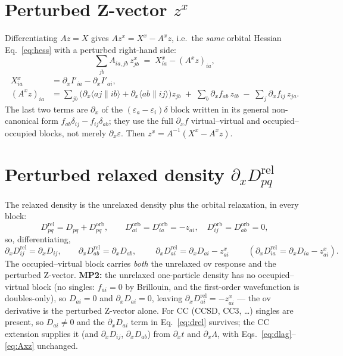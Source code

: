 \documentclass[11pt]{article}
\newcommand{\pd}[1]{\partial_{#1}}
\newcommand{\aeri}[1]{\langle #1 \rangle}   %
\begin{document}
\section{Perturbed Z-vector $z^x$}
Differentiating $A z = X$ gives $A z^x = X^x - A^x z$, i.e.\ the \emph{same} orbital Hessian
Eq.~\eqref{eq:hess} with a perturbed right-hand side:
\begin{equation}
  \sum_{jb} A_{ia,jb}\,z^x_{jb} \;=\; X^x_{ia} - (A^x z)_{ia},
\end{equation}
\begin{align}
  X^x_{ia} &= \pd{x}I'_{ia} - \pd{x}I'_{ai}, \\[4pt]
  (A^x z)_{ia} &= \sum_{jb}\big(\pd{x}\aeri{aj\|ib}+\pd{x}\aeri{ab\|ij}\big)z_{jb}
                 \;+\; \sum_{b}\pd{x}f_{ab}\,z_{ib}
                 \;-\; \sum_{j}\pd{x}f_{ij}\,z_{ja}.
  \label{eq:Axz}
\end{align}
The last two terms are $\pd{x}$ of the $(\varepsilon_a-\varepsilon_i)\delta$ block written in
its general non-canonical form $f_{ab}\delta_{ij}-f_{ij}\delta_{ab}$; they use the full
$\pd{x}f$ virtual--virtual and occupied--occupied blocks, not merely $\pd{x}\varepsilon$.
Then $z^x = A^{-1}(X^x - A^x z)$.

\section{Perturbed relaxed density $\pd{x}D^{\mathrm{rel}}_{pq}$}
The relaxed density is the unrelaxed density plus the orbital relaxation, in every block:
\begin{equation}
  D^{\mathrm{rel}}_{pq} = D_{pq} + D^{\mathrm{orb}}_{pq},\qquad
  D^{\mathrm{orb}}_{ai}=D^{\mathrm{orb}}_{ia}=-z_{ai},\quad D^{\mathrm{orb}}_{ij}=D^{\mathrm{orb}}_{ab}=0,
\end{equation}
so, differentiating,
\begin{equation}
  \pd{x}D^{\mathrm{rel}}_{ij} = \pd{x}D_{ij},\qquad
  \pd{x}D^{\mathrm{rel}}_{ab} = \pd{x}D_{ab},\qquad
  \boxed{\;\pd{x}D^{\mathrm{rel}}_{ai} = \pd{x}D_{ai} - z^x_{ai}\;}\qquad
  (\pd{x}D^{\mathrm{rel}}_{ia}=\pd{x}D_{ia}-z^x_{ai}).
  \label{eq:drel}
\end{equation}
The occupied--virtual block carries \emph{both} the unrelaxed ov response and the perturbed
Z-vector. \textbf{MP2:} the unrelaxed one-particle density has no occupied--virtual block
(no singles: $f_{ai}=0$ by Brillouin, and the first-order wavefunction is doubles-only), so
$D_{ai}=0$ and $\pd{x}D_{ai}=0$, leaving $\pd{x}D^{\mathrm{rel}}_{ai}=-z^x_{ai}$ --- the ov
derivative is the perturbed Z-vector alone. For CC (CCSD, CC3, \dots) singles are present, so
$D_{ai}\neq0$ and the $\pd{x}D_{ai}$ term in Eq.~\eqref{eq:drel} survives; the CC extension
supplies it (and $\pd{x}D_{ij}$, $\pd{x}D_{ab}$) from $\pd{x}t$ and $\pd{x}\Lambda$, with
Eqs.~\eqref{eq:dlag}--\eqref{eq:Axz} unchanged.
\end{document}

